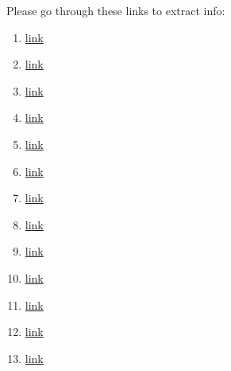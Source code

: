 \documentclass[10pt, openany]{book}
\begin{document}
\tableofcontents

\newpage


\newpage


\newpage


\newpage


Please go through these links to extract info:
\begin{enumerate}
    \item \href{https://www.youtube.com/watch?v=WujIkCgawFI&list=PLmK1EnKxphinxBub5hL0ZoJXWoqjkGE19&index=11}{link}
    \item \href{https://www.youtube.com/watch?v=jgh0TNfx0gQ}{link}
    \item \href{https://eshop.se.com/in/blog/post/difference-between-active-power-reactive-power-and-apparent-power.html#}{link}
    \item \href{https://www.allaboutcircuits.com/textbook/alternating-current/chpt-11/true-reactive-and-apparent-power/}{link}
    \item \href{https://laurenselectric.com/commercial-services/understanding-power-factor/}{link}
    \item \href{https://www.eeeguide.com/substations-interview-questions-and-answers/}{link}
    \item \href{https://circuitglobe.com/types-of-faults-in-power-system.html}{link}
    \item \href{https://peguru.com/2019/08/voltage-transformer/}{link}
    \item \href{https://www.pes-psrc.org/kb/report/047.pdf}{link}
    \item \href{https://electrical-engineering-portal.com/download-center/books-and-guides/relays}{link}
    \item \href{https://www.studyforfe.com/blog/fundamentals-of-single-line-diagrams/}{link}
    \item \href{https://eepower.com/technical-articles/calculating-the-turns-ratio-of-a-transformer/}{link}
    \item \href{https://eepower.com/power-electronics-textbook/vol-i-electrical-power-systems-design/chapter-5-impedance-matching-and-power-transfer/understanding-electrical-transformers/#}{link}
\end{enumerate}
\end{document}
